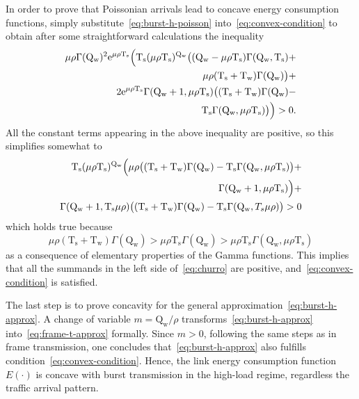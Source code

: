 \documentclass[journal,english,twocolumn,10pt,letterpaper]{IEEEtran}
\newcommand{\Constantconstant}[2]{\mathrm{#1}_{\mathrm{#2}}}
\newcommand{\Ts}{\Constantconstant T s}
\newcommand{\Tw}{\Constantconstant T w}
\newcommand{\Qw}{\Constantconstant Q w}
\begin{document}
In order to prove that Poissonian arrivals lead to concave energy consumption
functions, simply substitute~\eqref{eq:burst-h-poisson}
into~\eqref{eq:convex-condition} to obtain after some straightforward
calculations the inequality
\begin{equation}
  \begin{split}
    \mu\rho \Gamma(\Qw)^2 \textrm{e}^{\mu\rho \Ts} 
    \Bigl(
      \Ts (\mu\rho \Ts)^{\Qw} \bigl( 
        (\Qw - \mu\rho
        \Ts) \Gamma(\Qw, \Ts) + \\
        \mu\rho (\Ts + \Tw) \Gamma(\Qw) 
      \bigr) 
      +\\
      2\textrm{e}^{\mu\rho \Ts}
      \Gamma(\Qw + 1, \mu\rho \Ts) \bigl( 
        (\Ts + \Tw) \Gamma(\Qw) -\\
        \Ts \Gamma(\Qw, \mu\rho \Ts)
      \bigr) 
    \Bigr) > 0.
  \end{split} 
\end{equation}
All the constant terms appearing in the above inequality are positive, so
this simplifies somewhat to
\begin{equation}
  \label{eq:churro}
  \begin{split}
  \Ts (\mu\rho \Ts)^{\Qw} \Bigl( \mu\rho \bigl(
  (\Ts + \Tw) \Gamma(\Qw) -
  \Ts \Gamma(\Qw,\mu\rho \Ts) \bigr) + \\
  \Gamma(\Qw + 1, \mu\rho \Ts)
  \Bigr) + \\
  \Gamma(\Qw + 1, \Ts \mu \rho) \bigl( (\Ts +
  \Tw) \Gamma(\Qw) - 
  \Ts \Gamma(\Qw, T_s \mu\rho)
  \bigr) > 0
\end{split}
\end{equation}
which holds true because
\begin{equation}
  \mu\rho (\Ts + \Tw) \Gamma(\Qw) > \mu \rho \Ts
  \Gamma(\Qw) > \mu\rho \Ts \Gamma(\Qw, \mu\rho \Ts)
\end{equation}
as a consequence of elementary properties of the Gamma functions. This implies
that all the summands in the left side of~\eqref{eq:churro} are positive,
and~\eqref{eq:convex-condition} is satisfied.

The last step is to prove concavity for the general
approximation~\eqref{eq:burst-h-approx}. A change of variable $m = \Qw / \rho$
transforms~\eqref{eq:burst-h-approx} into~\eqref{eq:frame-t-approx} formally.
Since $m > 0$, following the same steps as in frame transmission, one
concludes that~\eqref{eq:burst-h-approx} also fulfills
condition~\eqref{eq:convex-condition}. Hence, the link energy consumption
function $E(\cdot)$ is concave with burst transmission in the high-load
regime, regardless the traffic arrival pattern.
\end{document}
